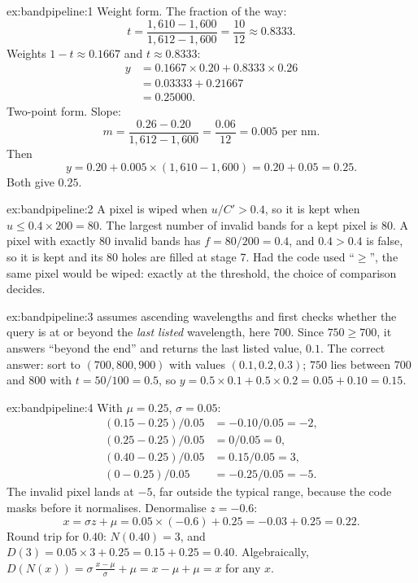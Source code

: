 
\begin{solution}{ex:bandpipeline:1}
Weight form. The fraction of the way:
\[ t = \frac{1{,}610 - 1{,}600}{1{,}612 - 1{,}600} = \frac{10}{12} \approx 0.8333. \]
Weights $1 - t \approx 0.1667$ and $t \approx 0.8333$:
\begin{align*}
y &= 0.1667 \times 0.20 + 0.8333 \times 0.26\\
  &= 0.03333 + 0.21667\\
  &= 0.25000.
\end{align*}
Two-point form. Slope:
\[ m = \frac{0.26 - 0.20}{1{,}612 - 1{,}600} = \frac{0.06}{12} = 0.005 \text{ per nm}. \]
Then
\[ y = 0.20 + 0.005 \times (1{,}610 - 1{,}600) = 0.20 + 0.05 = 0.25. \]
Both give $0.25$.
\end{solution}

\begin{solution}{ex:bandpipeline:2}
A pixel is wiped when $u/C' > 0.4$, so it is kept when $u \le 0.4 \times 200 = 80$. The largest number
of invalid bands for a kept pixel is $80$. A pixel with exactly $80$ invalid bands has
$f = 80/200 = 0.4$, and $0.4 > 0.4$ is false, so it is kept and its $80$ holes are filled at stage 7.
Had the code used ``$\ge$'', the same pixel would be wiped: exactly at the threshold, the choice of
comparison decides.
\end{solution}

\begin{solution}{ex:bandpipeline:3}
 assumes ascending wavelengths and first checks whether the query is at or beyond the
\emph{last listed} wavelength, here $700$. Since $750 \ge 700$, it answers ``beyond the end'' and
returns the last listed value, $0.1$. The correct answer: sort to $(700, 800, 900)$ with values
$(0.1, 0.2, 0.3)$; $750$ lies between $700$ and $800$ with $t = 50/100 = 0.5$, so
$y = 0.5 \times 0.1 + 0.5 \times 0.2 = 0.05 + 0.10 = 0.15$.
\end{solution}

\begin{solution}{ex:bandpipeline:4}
With $\mu = 0.25$, $\sigma = 0.05$:
\begin{align*}
(0.15 - 0.25)/0.05 &= -0.10/0.05 = -2,\\
(0.25 - 0.25)/0.05 &= 0/0.05 = 0,\\
(0.40 - 0.25)/0.05 &= 0.15/0.05 = 3,\\
(0 - 0.25)/0.05 &= -0.25/0.05 = -5.
\end{align*}
The invalid pixel lands at $-5$, far outside the typical range, because the code masks before it
normalises. Denormalise $z = -0.6$:
\[ x = \sigma z + \mu = 0.05 \times (-0.6) + 0.25 = -0.03 + 0.25 = 0.22. \]
Round trip for $0.40$: $N(0.40) = 3$, and $D(3) = 0.05 \times 3 + 0.25 = 0.15 + 0.25 = 0.40$.
Algebraically, $D(N(x)) = \sigma\,\frac{x - \mu}{\sigma} + \mu = x - \mu + \mu = x$ for any $x$.
\end{solution}

